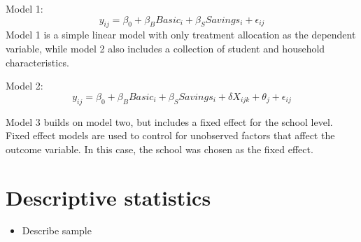 \documentclass[
]{article}
\providecommand{\tightlist}{%
  \setlength{\itemsep}{0pt}\setlength{\parskip}{0pt}}
\begin{document}
Model 1:
\[ y_{ij} = \beta_0 + \beta_{B} Basic_i + \beta_{S} Savings_i + \epsilon_{ij} \]
Model 1 is a simple linear model with only treatment allocation as the
dependent variable, while model 2 also includes a collection of student
and household characteristics.

Model 2:
\[ y_{ij} = \beta_0 + \beta_{B} Basic_i + \beta_{S} Savings_i + \delta X_{ijk} + \theta_{j} + \epsilon_{ij} \]

Model 3 builds on model two, but includes a fixed effect for the school
level. Fixed effect models are used to control for unobserved factors
that affect the outcome variable. In this case, the school was chosen as
the fixed effect.

\hypertarget{descriptive-statistics}{%
\section{Descriptive statistics}\label{descriptive-statistics}}

\begin{itemize}
\tightlist
\item
  Describe sample
\end{itemize}
\end{document}
